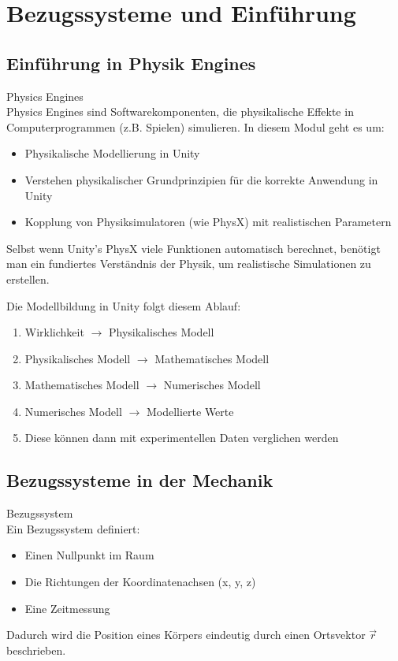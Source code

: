 \section{Bezugssysteme und Einführung}

\subsection{Einführung in Physik Engines}
\begin{concept}{Physics Engines}\\
    Physics Engines sind Softwarekomponenten, die physikalische Effekte in Computerprogrammen (z.B. Spielen) simulieren. In diesem Modul geht es um:
    \begin{itemize}
        \item Physikalische Modellierung in Unity
        \item Verstehen physikalischer Grundprinzipien für die korrekte Anwendung in Unity
        \item Kopplung von Physiksimulatoren (wie PhysX) mit realistischen Parametern
    \end{itemize}
    Selbst wenn Unity's PhysX viele Funktionen automatisch berechnet, benötigt man ein fundiertes Verständnis der Physik, um realistische Simulationen zu erstellen.
\end{concept}

\begin{remark}
    Die Modellbildung in Unity folgt diesem Ablauf:
    \begin{enumerate}
        \item Wirklichkeit $\rightarrow$ Physikalisches Modell
        \item Physikalisches Modell $\rightarrow$ Mathematisches Modell
        \item Mathematisches Modell $\rightarrow$ Numerisches Modell
        \item Numerisches Modell $\rightarrow$ Modellierte Werte
        \item Diese können dann mit experimentellen Daten verglichen werden
    \end{enumerate}
\end{remark}

\subsection{Bezugssysteme in der Mechanik}
\begin{definition}{Bezugssystem}\\
    Ein Bezugssystem definiert:
    \begin{itemize}
        \item Einen Nullpunkt im Raum
        \item Die Richtungen der Koordinatenachsen (x, y, z)
        \item Eine Zeitmessung
    \end{itemize}
    Dadurch wird die Position eines Körpers eindeutig durch einen Ortsvektor $\vec{r}$ beschrieben.
\end{definition}

